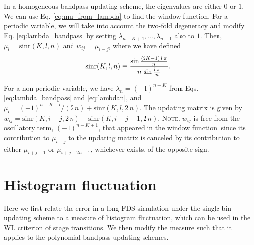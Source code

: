 \documentclass[reprint, superscriptaddress, floatfix]{revtex4-1}
\newcommand{\note}[1]{{\color{DarkGreen}\footnotesize \textsc{Note.} #1}}
\begin{document}
In a homogeneous bandpass updating scheme,
the eigenvalues are either $0$ or $1$.
%
We can use Eq. \eqref{eq:mu_from_lambda}
to find the window function.
%
For a periodic variable,
we will take into account the two-fold degeneracy
and modify Eq. \eqref{eq:lambda_bandpass}
by setting $\lambda_{n-K+1}, \dots, \lambda_{n-1}$
also to $1$.
%
Then, $\mu_l = \mathrm{sinr}(K, l, n)$ and $w_{ij} = \mu_{i-j}$,
where we have defined
\begin{equation}
  \mathrm{sinr}(K, l, n)
  \equiv
  \frac{
    \sin
    \frac{ (2 K - 1) \, l \, \pi }
         {              n        }
  }
  {
    n \, \sin \frac{ l \, \pi } { n }
  }
  .
\notag
\end{equation}
%

For a non-periodic variable,
we have $\lambda_n = (-1)^{n-K}$
from Eqs. \eqref{eq:lambda_bandpass} and \eqref{eq:lambdan},
and $\mu_l = (-1)^{n-K+l}/(2 \, n) + \mathrm{sinr}(K, l, 2 \, n)$.
%
The updating matrix is given by
$w_{ij} = \mathrm{sinr}(K, i-j, 2 \, n) + \mathrm{sinr}(K, i+j-1, 2 \, n)$.
%
\note{$w_{ij}$
  is free from the oscillatory term, $(-1)^{n-K+1}$,
  that appeared in the window function, since
  its contribution to $\mu_{i-j}$ to the updating matrix
  is canceled by its contribution to either $\mu_{i+j-1}$
  or $\mu_{i+j-2n-1}$,
  whichever exists, of the opposite sign.}
%



\section{\label{sec:hfluc}
Histogram fluctuation}


Here we first relate the error
in a long FDS simulation under the single-bin updating scheme
to a measure of histogram fluctuation,
which can be used in the WL criterion of stage transitions.
%
We then modify the measure
such that it applies to
the polynomial bandpass updating schemes.

\end{document}
